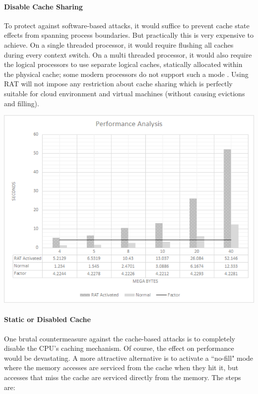 \paragraph{Disable Cache Sharing}
To protect against software-based attacks, it would suffice to prevent cache state effects from spanning process boundaries. But practically this is very expensive to achieve. On a single threaded processor, it would require flushing all caches during every context switch. On a multi threaded processor, it would also require the logical processors to use separate logical caches, statically allocated within the physical cache; some modern processors do not support such a mode \citep{osvik}. Using RAT will not impose any restriction about cache sharing which is perfectly suitable for cloud environment and virtual machines (without causing evictions and filling).

\begin{center}
\includegraphics[scale=0.6,natwidth=640,natheight=480]{psd/performance_analysis.png}
\end{center}

\paragraph{Static or Disabled Cache}
One brutal countermeasure against the cache-based attacks is to completely disable the CPU's caching mechanism. Of course, the effect on performance would be devastating. A more attractive alternative is to activate a ``no-fill" mode where the memory accesses are serviced from the cache when they hit it, but accesses that miss the cache are serviced directly from the memory. The steps are:

